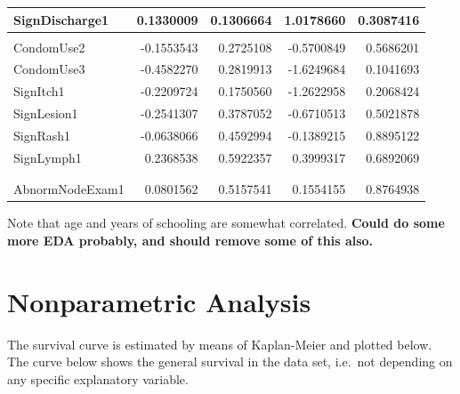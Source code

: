 \documentclass[
]{article}
\begin{document}
\begin{table}
\begin{tabular}[t]{l|r|r|r|r}
\hline
SignDischarge1 & 0.1330009 & 0.1306664 & 1.0178660 & 0.3087416\\
\hline
\cellcolor{cyan}{\textcolor{white}{SignDysuria1}} & \cellcolor{cyan}{\textcolor{white}{0.1954606}} & \cellcolor{cyan}{\textcolor{white}{0.1812469}} & \cellcolor{cyan}{\textcolor{white}{1.0784219}} & \cellcolor{cyan}{\textcolor{white}{0.2808455}}\\
\hline
CondomUse2 & -0.1553543 & 0.2725108 & -0.5700849 & 0.5686201\\
\hline
CondomUse3 & -0.4582270 & 0.2819913 & -1.6249684 & 0.1041693\\
\hline
SignItch1 & -0.2209724 & 0.1750560 & -1.2622958 & 0.2068424\\
\hline
SignLesion1 & -0.2541307 & 0.3787052 & -0.6710513 & 0.5021878\\
\hline
SignRash1 & -0.0638066 & 0.4592994 & -0.1389215 & 0.8895122\\
\hline
SignLymph1 & 0.2368538 & 0.5922357 & 0.3999317 & 0.6892069\\
\hline
\cellcolor{cyan}{\textcolor{white}{InvVagAtExam1}} & \cellcolor{cyan}{\textcolor{white}{0.5726933}} & \cellcolor{cyan}{\textcolor{white}{0.2003764}} & \cellcolor{cyan}{\textcolor{white}{2.8580874}} & \cellcolor{cyan}{\textcolor{white}{0.0042620}}\\
\hline
\cellcolor{cyan}{\textcolor{white}{DischargeExam1}} & \cellcolor{cyan}{\textcolor{white}{-0.5805191}} & \cellcolor{cyan}{\textcolor{white}{0.2691414}} & \cellcolor{cyan}{\textcolor{white}{-2.1569301}} & \cellcolor{cyan}{\textcolor{white}{0.0310111}}\\
\hline
AbnormNodeExam1 & 0.0801562 & 0.5157541 & 0.1554155 & 0.8764938\\
\hline
\end{tabular}
\end{table}

Note that age and years of schooling are somewhat correlated. \textbf{Could do some more EDA probably, and should remove some of this also.}

\hypertarget{nonparametric-analysis}{%
\section{Nonparametric Analysis}\label{nonparametric-analysis}}

The survival curve is estimated by means of Kaplan-Meier and plotted below. The curve below shows the general survival in the data set, i.e.~not depending on any specific explanatory variable.
\end{document}
